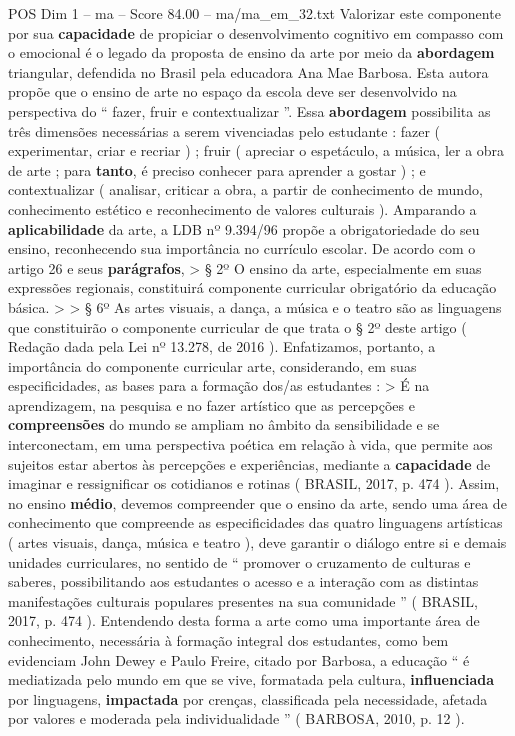 \begin{textsample}{POS Dim 1 – ma – Score 84.00 – ma/ma\_em\_32.txt}
Valorizar este componente por sua \textbf{capacidade} de propiciar o desenvolvimento cognitivo em compasso com o emocional é o legado da proposta de ensino da arte por meio da \textbf{abordagem} triangular, defendida no Brasil pela educadora Ana Mae Barbosa.
Esta autora propõe que o ensino de arte no espaço da escola deve ser desenvolvido na perspectiva do “ fazer, fruir e contextualizar ”.
Essa \textbf{abordagem} possibilita as três dimensões necessárias a serem vivenciadas pelo estudante : fazer ( experimentar, criar e recriar ) ; fruir ( apreciar o espetáculo, a música, ler a obra de arte ; para \textbf{tanto}, é preciso conhecer para aprender a gostar ) ; e contextualizar ( analisar, criticar a obra, a partir de conhecimento de mundo, conhecimento estético e reconhecimento de valores culturais ).
Amparando a \textbf{aplicabilidade} da arte, a LDB nº 9.394/96 propõe a obrigatoriedade do seu ensino, reconhecendo sua importância no currículo escolar.
De acordo com o artigo 26 e seus \textbf{parágrafos}, > § 2º O ensino da arte, especialmente em suas expressões regionais, constituirá componente curricular obrigatório da educação básica. > > § 6º As artes visuais, a dança, a música e o teatro são as linguagens que constituirão o componente curricular de que trata o § 2º deste artigo ( Redação dada pela Lei nº 13.278, de 2016 ).
Enfatizamos, portanto, a importância do componente curricular arte, considerando, em suas especificidades, as bases para a formação dos/as estudantes : > É na aprendizagem, na pesquisa e no fazer artístico que as percepções e \textbf{compreensões} do mundo se ampliam no âmbito da sensibilidade e se interconectam, em uma perspectiva poética em relação à vida, que permite aos sujeitos estar abertos às percepções e experiências, mediante a \textbf{capacidade} de imaginar e ressignificar os cotidianos e rotinas ( BRASIL, 2017, p. 474 ).
Assim, no ensino \textbf{médio}, devemos compreender que o ensino da arte, sendo uma área de conhecimento que compreende as especificidades das quatro linguagens artísticas ( artes visuais, dança, música e teatro ), deve garantir o diálogo entre si e demais unidades curriculares, no sentido de “ promover o cruzamento de culturas e saberes, possibilitando aos estudantes o acesso e a interação com as distintas manifestações culturais populares presentes na sua comunidade ” ( BRASIL, 2017, p. 474 ).
Entendendo desta forma a arte como uma importante área de conhecimento, necessária à formação integral dos estudantes, como bem evidenciam John Dewey e Paulo Freire, citado por Barbosa, a educação “ é mediatizada pelo mundo em que se vive, formatada pela cultura, \textbf{influenciada} por linguagens, \textbf{impactada} por crenças, classificada pela necessidade, afetada por valores e moderada pela individualidade ” ( BARBOSA, 2010, p. 12 ).

\end{textsample}
